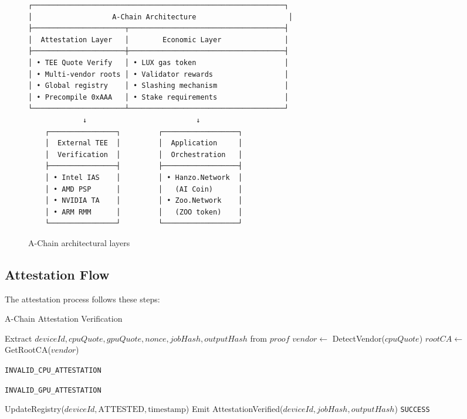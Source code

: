 \documentclass[11pt,a4paper]{article}
\begin{document}
\begin{figure}[h]
\centering
\begin{verbatim}
┌────────────────────────────────────────────────────────────┐
│                   A-Chain Architecture                      │
├──────────────────────┬─────────────────────────────────────┤
│  Attestation Layer   │        Economic Layer               │
├──────────────────────┼─────────────────────────────────────┤
│ • TEE Quote Verify   │ • LUX gas token                     │
│ • Multi-vendor roots │ • Validator rewards                 │
│ • Global registry    │ • Slashing mechanism                │
│ • Precompile 0xAAA   │ • Stake requirements                │
└──────────────────────┴─────────────────────────────────────┘
             ↓                          ↓
    ┌────────────────┐         ┌──────────────────┐
    │  External TEE  │         │  Application     │
    │  Verification  │         │  Orchestration   │
    ├────────────────┤         ├──────────────────┤
    │ • Intel IAS    │         │ • Hanzo.Network  │
    │ • AMD PSP      │         │   (AI Coin)      │
    │ • NVIDIA TA    │         │ • Zoo.Network    │
    │ • ARM RMM      │         │   (ZOO token)    │
    └────────────────┘         └──────────────────┘
\end{verbatim}
\caption{A-Chain architectural layers}
\end{figure}

\subsection{Attestation Flow}

The attestation process follows these steps:

\begin{algorithm}[H]
\caption{A-Chain Attestation Verification}
\begin{algorithmic}[1]
    \State Extract $deviceId, cpuQuote, gpuQuote, nonce, jobHash, outputHash$ from $proof$
    \State $vendor \gets$ DetectVendor($cpuQuote$)
    \State $rootCA \gets$ GetRootCA($vendor$)
    
        \State \Return \texttt{INVALID\_CPU\_ATTESTATION}
    \EndIf
    
            \State \Return \texttt{INVALID\_GPU\_ATTESTATION}
        \EndIf
    \EndIf
    
    \State UpdateRegistry($deviceId, \text{ATTESTED}, \text{timestamp}$)
    \State Emit AttestationVerified($deviceId, jobHash, outputHash$)
    \State \Return \texttt{SUCCESS}
\EndFunction
\end{algorithmic}
\end{algorithm}
\end{document}
